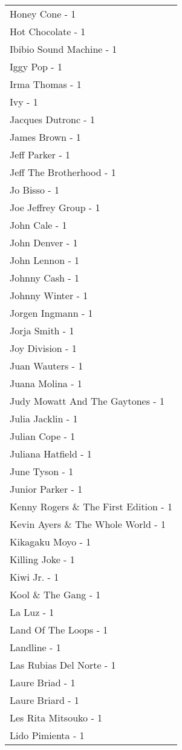 \documentclass[
]{article}
\begin{document}
\begin{longtable}{l}
Honey Cone - 1 \\ 
Hot Chocolate - 1 \\ 
Ibibio Sound Machine - 1 \\ 
Iggy Pop - 1 \\ 
Irma Thomas - 1 \\ 
Ivy - 1 \\ 
Jacques Dutronc - 1 \\ 
James Brown - 1 \\ 
Jeff Parker - 1 \\ 
Jeff The Brotherhood - 1 \\ 
Jo Bisso - 1 \\ 
Joe Jeffrey Group - 1 \\ 
John Cale - 1 \\ 
John Denver - 1 \\ 
John Lennon - 1 \\ 
Johnny Cash - 1 \\ 
Johnny Winter - 1 \\ 
Jorgen Ingmann - 1 \\ 
Jorja Smith - 1 \\ 
Joy Division - 1 \\ 
Juan Wauters - 1 \\ 
Juana Molina - 1 \\ 
Judy Mowatt And The Gaytones - 1 \\ 
Julia Jacklin - 1 \\ 
Julian Cope - 1 \\ 
Juliana Hatfield - 1 \\ 
June Tyson - 1 \\ 
Junior Parker - 1 \\ 
Kenny Rogers \& The First Edition - 1 \\ 
Kevin Ayers \& The Whole World - 1 \\ 
Kikagaku Moyo - 1 \\ 
Killing Joke - 1 \\ 
Kiwi Jr. - 1 \\ 
Kool \& The Gang - 1 \\ 
La Luz - 1 \\ 
Land Of The Loops - 1 \\ 
Landline - 1 \\ 
Las Rubias Del Norte - 1 \\ 
Laure Briad - 1 \\ 
Laure Briard - 1 \\ 
Les Rita Mitsouko - 1 \\ 
Lido Pimienta - 1 \\ 

\end{longtable}
\end{document}
